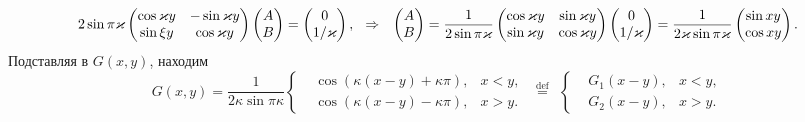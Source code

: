 \begin{equation*}
    2 \sin \pi \kappa 
    \begin{pmatrix}
        \cos \kappa y & - \sin \kappa y  \\
        \sin \xi y & \cos \kappa y  \\
    \end{pmatrix} \begin{pmatrix}
        A  \\
        B  \\
    \end{pmatrix}
    = \begin{pmatrix}
        0 \\ 1/\kappa
    \end{pmatrix},
    \hspace{0.25cm} \Rightarrow \hspace{0.25cm}
    \begin{pmatrix}
        A \\ B
    \end{pmatrix} = 
    \frac{1}{2 \sin \pi \kappa} \begin{pmatrix}
        \cos \kappa y & \sin \kappa y  \\
        \sin \kappa y & \cos \kappa y  \\
    \end{pmatrix}
    \begin{pmatrix}
        0 \\ 1/\kappa
    \end{pmatrix} = 
    \frac{1}{2 \kappa \sin \pi \kappa} \begin{pmatrix}
        \sin xy \\ \cos xy
    \end{pmatrix}.
\end{equation*}
Подставляя в $G(x, y)$, находим
\begin{equation*}
    G(x, y) = \frac{1}{2 \kappa \sin \pi \kappa}
    \left\{\begin{aligned}
        &\cos (\kappa(x-y) + \kappa \pi), &x < y,\\
        &\cos(\kappa (x-y) - \kappa \pi), &x > y.
    \end{aligned}\right.
    \ \
    \overset{\mathrm{def}}{=} 
    \ \ 
    \left\{\begin{aligned}
        &G_1(x-y), &x<y, \\ 
        &G_2(x-y), &x>y.
    \end{aligned}\right.
\end{equation*}


